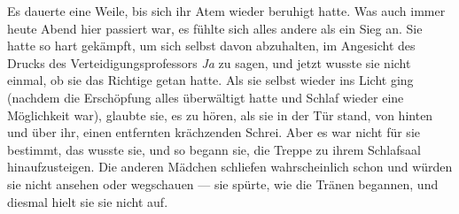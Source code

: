 Es dauerte eine Weile, bis sich ihr Atem wieder beruhigt hatte. Was auch immer heute Abend hier passiert war, es fühlte sich alles andere als ein Sieg an. Sie hatte so hart gekämpft, um sich selbst davon abzuhalten, im Angesicht des Drucks des Verteidigungsprofessors \emph{Ja} zu sagen, und jetzt wusste sie nicht einmal, ob sie das Richtige getan hatte.
Als sie selbst wieder ins Licht ging (nachdem die Erschöpfung alles überwältigt hatte und Schlaf wieder eine Möglichkeit war), glaubte sie, es zu hören, als sie in der Tür stand, von hinten und über ihr, einen entfernten krächzenden Schrei.
Aber es war nicht für sie bestimmt, das wusste sie, und so begann sie, die Treppe zu ihrem Schlafsaal hinaufzusteigen.
Die anderen Mädchen schliefen wahrscheinlich schon und würden sie nicht ansehen oder wegschauen —
sie spürte, wie die Tränen begannen, und diesmal hielt sie sie nicht auf.

